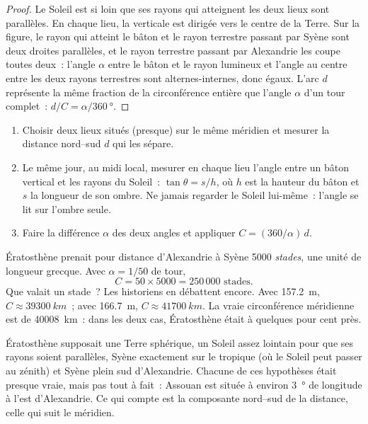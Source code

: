 \begin{proof}
Le Soleil est si loin que ses rayons qui atteignent les deux lieux sont
parallèles. En chaque lieu, la verticale est dirigée vers le centre de la
Terre. Sur la figure, le rayon qui atteint le bâton et le rayon terrestre
passant par Syène sont deux droites parallèles, et le rayon terrestre
passant par Alexandrie les coupe toutes deux~: l'angle $\alpha$ entre le
bâton et le rayon lumineux et l'angle au centre entre les deux rayons
terrestres sont alternes-internes, donc égaux. L'arc $d$ représente la même
fraction de la circonférence entière que l'angle $\alpha$ d'un tour
complet~: $d/C = \alpha/\qty{360}{\degree}$.
\end{proof}

\begin{method}\label{met:g10:measuring-the-earth:shadows}
\begin{enumerate}
  \item Choisir deux lieux situés (presque) sur le même méridien et mesurer
        la distance nord--sud $d$ qui les sépare.
  \item Le même jour, au midi local, mesurer en chaque lieu l'angle entre un
        bâton vertical et les rayons du Soleil~: $\tan \theta = s/h$, où $h$
        est la hauteur du bâton et $s$ la longueur de son ombre. Ne jamais
        regarder le Soleil lui-même~: l'angle se lit sur l'ombre seule.
  \item Faire la différence $\alpha$ des deux angles et appliquer
        $C = (360/\alpha)\,d$.
\end{enumerate}
\end{method}

\begin{example}\label{ex:g10:measuring-the-earth:numbers}
Ératosthène prenait pour distance d'Alexandrie à Syène 5000
\emph{stades}, une unité de longueur grecque. Avec $\alpha = 1/50$ de tour,
\[
  C = 50 \times 5000 = 250\,000 \text{ stades}.
\]
Que valait un stade~? Les historiens en débattent encore. Avec
\qty{157.2}{m}, $C \approx \qty{39300}{km}$~; avec \qty{166.7}{m},
$C \approx \qty{41700}{km}$. La vraie circonférence méridienne est de
\qty{40008}{km}~: dans les deux cas, Ératosthène était à quelques pour cent
près.
\end{example}

\begin{remark}\label{rem:g10:measuring-the-earth:assumptions}
Ératosthène supposait une Terre sphérique, un Soleil assez lointain pour
que ses rayons soient parallèles, Syène exactement sur le tropique (où le
Soleil peut passer au zénith) et Syène plein sud d'Alexandrie. Chacune de
ces hypothèses était presque vraie, mais pas tout à fait~: Assouan est
située à environ \qty{3}{\degree} de longitude à l'est d'Alexandrie. Ce qui
compte est la composante nord--sud de la distance, celle qui suit le
méridien.
\end{remark}

